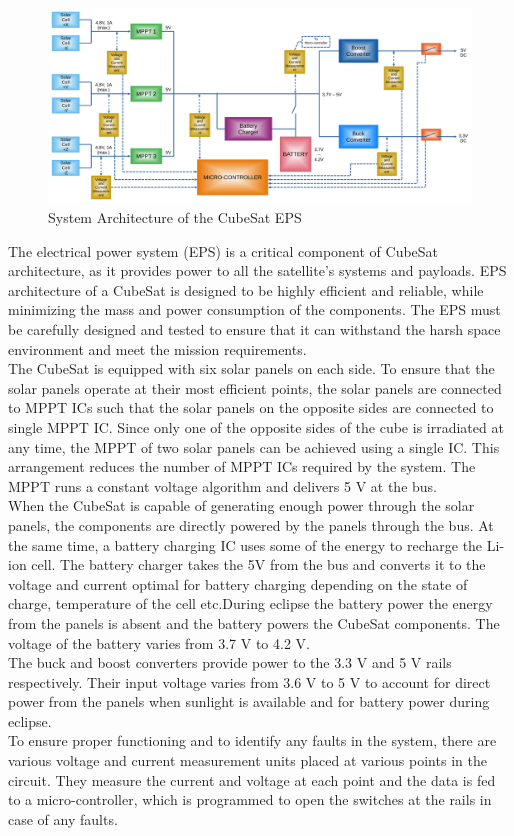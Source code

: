 \begin{figure}[h]
	\centering
	\includegraphics[width=\columnwidth]{IMGS/diag1.pdf}
	\caption{System Architecture of the CubeSat EPS}
	\label{fig:arch}
\end{figure} 
The electrical power system (EPS) is a critical component of CubeSat architecture, as it provides power to all the satellite's systems and payloads. EPS architecture of a CubeSat is designed to be highly efficient and reliable, while minimizing the mass and power consumption of the components. The EPS must be carefully designed and tested to ensure that it can withstand the harsh space environment and meet the mission requirements.\\


The CubeSat is equipped with six solar panels on each side. To ensure that the solar panels operate at their most efficient points, the solar panels are connected to MPPT ICs such that the solar panels on the opposite sides are connected to single MPPT IC. Since only one of the opposite sides of the cube is irradiated at any time, the MPPT of two solar panels can be achieved using a single IC. This arrangement reduces the number of MPPT ICs required by the system. The MPPT runs a constant voltage algorithm and delivers 5 V at the bus. 
\\

When the CubeSat is capable of generating enough power through the solar panels, the components are directly powered by the panels through the bus. At the same time, a battery charging IC uses some of the energy to recharge the Li-ion cell. The battery charger takes the 5V from the bus and converts it to the voltage and current optimal for battery charging depending on the state of charge, temperature of the cell etc.During eclipse the battery power the energy from the panels is absent and the battery powers the CubeSat components. The voltage of the battery varies from 3.7 V to 4.2 V.
\\

The buck and boost converters provide power to the 3.3 V and 5 V rails respectively. Their input voltage varies from 3.6 V to 5 V to account for direct power from the panels when sunlight is available and for battery power during eclipse.
\\

To ensure proper functioning and to identify any faults in the system, there are various voltage and current measurement units placed at various points in the circuit. They measure the current and voltage at each point and the data is fed to a micro-controller, which is programmed to open the switches at the rails in case of any faults.